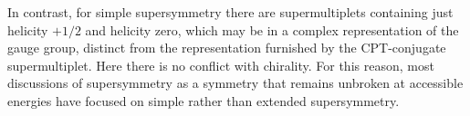 In contrast, for simple supersymmetry there are supermultiplets containing
just helicity $+1/2$ and helicity zero, which may be in a complex
representation of the gauge group, distinct from the representation furnished
by the CPT-conjugate supermultiplet. Here there is no conflict with chirality.
For this reason, most discussions of supersymmetry as a symmetry that remains
unbroken at accessible energies have focused on simple rather than extended
supersymmetry.
